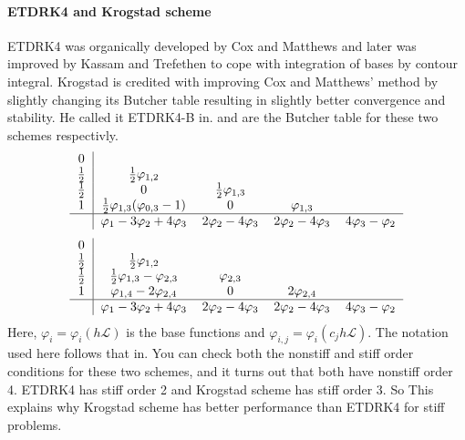 \paragraph{ETDRK4 and Krogstad scheme}
ETDRK4 was organically developed by Cox and Matthews and later was
improved by Kassam and Trefethen to cope with integration of
bases  by contour integral. Krogstad
is credited with
improving Cox and Matthews’ method by slightly changing its Butcher table
resulting in slightly better convergence and stability. He called it ETDRK4-B
in.  and 
are the Butcher table for these two schemes respectivly.
\begin{equation}
  \label{eq:etdrk4}
  \begin{tabular}{c | c c c c}
    0 & & & & \\
    $\frac{1}{2}$  & $\frac{1}{2}\varphi_{1, 2}$ &&&\\
    $\frac{1}{2}$ & 0 & $\frac{1}{2}\varphi_{1, 3}$ &&\\
    1 & $\frac{1}{2}\varphi_{1,3}(\varphi_{0,3}-1)$ & 0 & $\varphi_{1,3}$ & \\
    \hline
      & $\varphi_{1}-3\varphi_{2}+4\varphi_{3}$ & $2\varphi_{2}-4\varphi_{3}$
          & $2\varphi_{2}-4\varphi_{3}$ & $4\varphi_{3}-\varphi_{2}$ \\
  \end{tabular}
\end{equation}
\begin{equation}
  \label{eq:krogstad}
  \begin{tabular}{c | c c c c}
    0 & & & & \\
    $\frac{1}{2}$  & $\frac{1}{2}\varphi_{1, 2}$ &&&\\
    $\frac{1}{2}$ & $\frac{1}{2}\varphi_{1, 3} -\varphi_{2, 3}$ & $\varphi_{2, 3}$ &&\\
    1 & $\varphi_{1,4}-2\varphi_{2,4}$ & 0 & $2\varphi_{2,4}$ & \\
    \hline
      & $\varphi_{1}-3\varphi_{2}+4\varphi_{3}$ & $2\varphi_{2}-4\varphi_{3}$
          & $2\varphi_{2}-4\varphi_{3}$ & $4\varphi_{3}-\varphi_{2}$ \\
  \end{tabular}
\end{equation}
Here, $\varphi_i = \varphi_i(h\mathcal{L})$ is the base functions 
and
$\varphi_{i,j}=\varphi_i(c_jh\mathcal{L})$. The notation used here follows that
in. You can check both the nonstiff and stiff order conditions for
these two schemes, and it turns out that both have nonstiff order 4. ETDRK4 has
stiff order 2 and Krogstad scheme has stiff order 3. So This explains why
Krogstad scheme has better performance than ETDRK4 for stiff problems.

